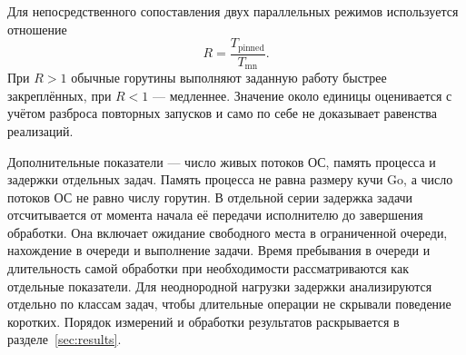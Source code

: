 Для непосредственного сопоставления двух параллельных режимов используется отношение
\begin{equation}
  R = \frac{T_{\mathrm{pinned}}}{T_{\mathrm{mn}}}.
  \label{eq:threading-ratio}
\end{equation}
При $R > 1$ обычные горутины выполняют заданную работу быстрее закреплённых, при $R < 1$ — медленнее.
  Значение около единицы оценивается с учётом разброса повторных запусков и само по себе
  не доказывает равенства реализаций.

Дополнительные показатели — число живых потоков ОС, память процесса и задержки отдельных задач.
  Память процесса не равна размеру кучи Go, а число потоков ОС не равно числу горутин.
  В отдельной серии задержка задачи отсчитывается от момента начала её передачи исполнителю
  до завершения обработки. Она включает ожидание свободного места в ограниченной очереди,
  нахождение в очереди и выполнение задачи. Время пребывания в очереди и длительность самой
  обработки при необходимости рассматриваются как отдельные показатели.
  Для неоднородной нагрузки задержки анализируются отдельно по классам задач, чтобы длительные
  операции не скрывали поведение коротких. Порядок измерений и обработки результатов раскрывается
  в разделе~\ref{sec:results}.
